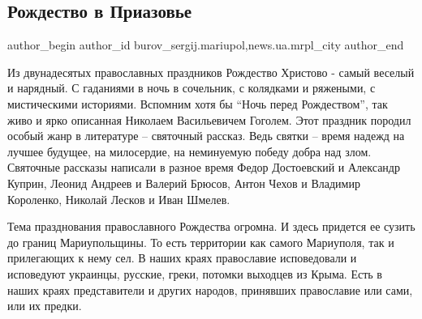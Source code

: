  
 
 
 
 
 
\subsection{Рождество в Приазовье}
\label{sec:06_01_2017.stz.news.ua.mrpl_city.1.rozhdestvo_v_priazovje}
 
\ifcmt
 author_begin
   author_id burov_sergij.mariupol,news.ua.mrpl_city
 author_end
\fi


Из двунадесятых православных праздников Рождество Христово - самый веселый и
нарядный. С гаданиями в ночь в сочельник, с колядками и ряжеными, с
мистическими историями. Вспомним хотя бы \enquote{Ночь перед Рождеством}, так живо и
ярко описанная Николаем Васильевичем Гоголем. Этот праздник породил особый жанр
в литературе – святочный рассказ. Ведь святки – время надежд на лучшее будущее,
на милосердие,  на неминуемую победу добра над злом. Святочные рассказы
написали в разное время Федор Достоевский и Александр Куприн, Леонид Андреев и
Валерий Брюсов, Антон Чехов и Владимир Короленко, Николай Лесков и Иван Шмелев.


Тема празднования православного Рождества огромна. И  здесь придется ее сузить
до границ Мариупольщины. То есть территории как самого Мариуполя, так и
прилегающих  к нему сел. В наших краях православие исповедовали и исповедуют
украинцы, русские, греки, потомки выходцев из Крыма. Есть в наших краях
представители и других народов, принявших православие или сами, или их предки.


